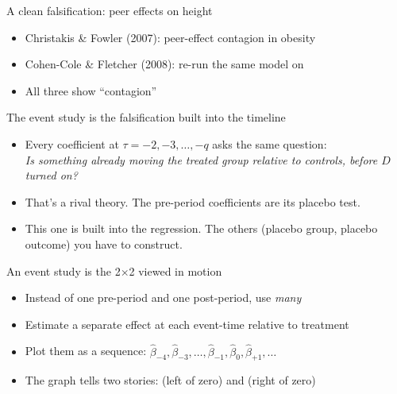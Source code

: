 \documentclass[aspectratio=169,11pt]{beamer}
\begin{document}
\begin{frame}{A clean falsification: peer effects on height}
\vspace{0.6em}
\begin{itemize}
  \item Christakis \& Fowler (2007): peer-effect contagion in obesity
  \item Cohen-Cole \& Fletcher (2008): re-run the same model on 
  \item All three show ``contagion''
\end{itemize}
\vspace{1em}
\vspace{0.4em}
\end{frame}

\begin{frame}{The event study is the falsification built into the timeline}
\vspace{0.5em}
\begin{itemize}
  \item Every coefficient at $\tau = -2, -3, \ldots, -q$ asks the same question: \\
  \textit{Is something already moving the treated group relative to controls, before $D$ turned on?}
  \item That's a rival theory. The pre-period coefficients are its placebo test.
  \item This one is built into the regression. The others (placebo group, placebo outcome) you have to construct.
\end{itemize}
\vspace{0.4em}
\end{frame}

\begin{frame}{An event study is the 2$\times$2 viewed in motion}
\vspace{0.6em}
\begin{itemize}
  \item Instead of one pre-period and one post-period, use \textit{many}
  \item Estimate a separate effect at each event-time relative to treatment
  \item Plot them as a sequence: $\hat{\beta}_{-4}, \hat{\beta}_{-3}, \ldots, \hat{\beta}_{-1}, \hat{\beta}_{0}, \hat{\beta}_{+1}, \ldots$
  \item The graph tells two stories:  (left of zero) and  (right of zero)
\end{itemize}
\end{frame}
\end{document}
